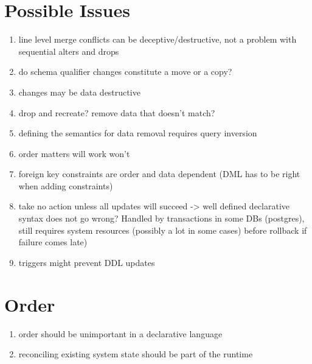 \documentclass[12pt]{article}
\begin{document}
\section{Possible Issues}

\begin{enumerate}
  \item line level merge conflicts can be deceptive/destructive, not a problem with sequential alters and drops
  \item do schema qualifier changes constitute a move or a copy?
  \item {} changes may be data destructive
  \item {} drop and recreate? remove data that doesn't match?
  \item {} defining the semantics for data removal requires query inversion
  \item order matters  will work  won't
  \item foreign key constraints are order and data dependent (DML has to be right when adding constraints)
  \item take no action unless all updates will succeed -> well defined declarative syntax does not go wrong? Handled by transactions in some DBs (postgres), still requires system resources (possibly a lot in some cases) before rollback if failure comes late)
  \item triggers might prevent DDL updates
\end{enumerate}

\section{Order}

\begin{enumerate}
  \item order should be unimportant in a declarative language
  \item reconciling existing system state should be part of the runtime
\end{enumerate}

\newpage



\end{document}
